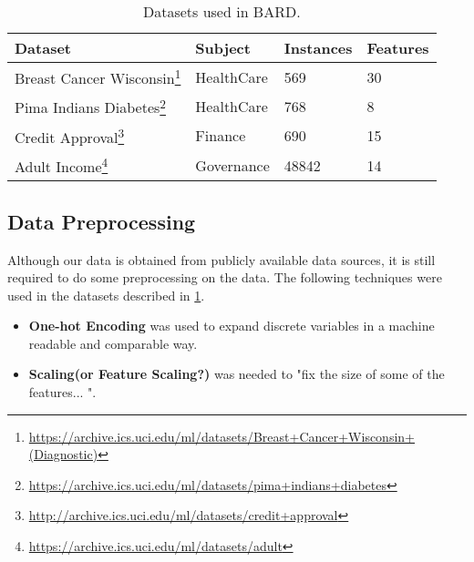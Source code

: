 \begin{table}[H]
\centering
\caption{Datasets used in \ac{BARD}.}
\label{table:datasets}
\begin{tabular}{|l|l|l|l|}
\hline
\textbf{Dataset} & \textbf{Subject} & \textbf{Instances} & \textbf{Features} \\ \hline
 Breast Cancer Wisconsin\footnote{\url{https://archive.ics.uci.edu/ml/datasets/Breast+Cancer+Wisconsin+(Diagnostic)}}  &  HealthCare  & 569    & 30       \\ \hline
 Pima Indians Diabetes\footnote{\url{https://archive.ics.uci.edu/ml/datasets/pima+indians+diabetes}}    &  HealthCare  & 768    &  8       \\ \hline
 Credit Approval\footnote{\url{http://archive.ics.uci.edu/ml/datasets/credit+approval}}          &  Finance     & 690    & 15       \\ \hline
 Adult Income\footnote{\url{https://archive.ics.uci.edu/ml/datasets/adult}}             &  Governance  & 48842  & 14       \\ \hline 
\end{tabular}
\end{table}


\subsection{Data Preprocessing}
\label{subsec:DataPreProcessingImplementation}

Although our data is obtained from publicly available data sources, it is still required to do some preprocessing on the data. The following techniques were used in the datasets described in \ref{table:datasets}.

\begin{itemize}
    \setlength\itemsep{1em}

	\item\textbf{One-hot Encoding}\cite{harris2010digital} was used to expand discrete variables in a machine readable and comparable way. 

	\item\textbf{Scaling(or Feature Scaling?)} was needed to "fix the size of some of the features... ".
\end{itemize}






